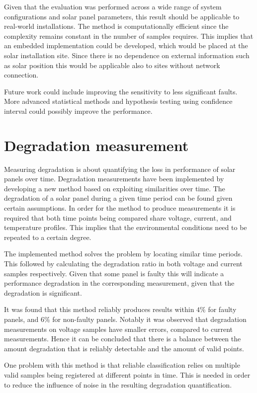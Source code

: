 Given that the evaluation was performed across a wide range of system configurations and solar panel parameters, this result should be applicable to real-world installations.
The method is computationally efficient since the complexity remains constant in the number of samples requires.
This implies that an embedded implementation could be developed, which would be placed at the solar installation site.
Since there is no dependence on external information such as solar position this would be applicable also to sites without network connection.

Future work could include improving the sensitivity to less significant faults.
More advanced statistical methods and hypothesis testing using confidence interval could possibly improve the performance.

\section{Degradation measurement}
Measuring degradation is about quantifying the loss in performance of solar panels over time.
Degradation measurements have been implemented by developing a new method based on exploiting similarities over time.
The degradation of a solar panel during a given time period can be found given certain assumptions.
In order for the method to produce measurements it is required that both time points being compared share voltage, current, and temperature profiles.
This implies that the environmental conditions need to be repeated to a certain degree.

The implemented method solves the problem by locating similar time periods.
This followed by calculating the degradation ratio in both voltage and current samples respectively.
Given that some panel is faulty this will indicate a performance degradation in the corresponding measurement, given that the degradation is significant.

It was found that this method reliably produces results within $4\%$ for faulty panels, and $6\%$ for non-faulty panels.
Notably it was observed that degradation measurements on voltage samples have smaller errors, compared to current measurements.
Hence it can be concluded that there is a balance between the amount degradation that is reliably detectable and the amount of valid points.

One problem with this method is that reliable classification relies on multiple valid samples being registered at different points in time.
This is needed in order to reduce the influence of noise in the resulting degradation quantification.

